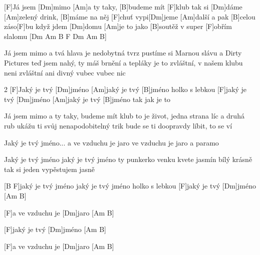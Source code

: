 
[F]Já jsem [Dm]mimo [Am]a ty taky, [B]budeme mít [F]klub
tak si [Dm]dáme [Am]zelený drink, [B]máme na něj [F]chuť
vypi[Dm]jeme [Am]další a pak [B]celou záso[F]bu
když jdem [Dm]domu [Am]je to jako [B]soutěž v super [F]obřím slalomu [Dm Am B F Dm Am B]

Já jsem mimo a tvá hlava je nedobytná tvrz
pustíme si Marnou slávu a Dirty Pictures
teď jsem nahý, ty máš brnění a tepláky
je to zvláštní, v našem klubu neni zvláštní ani divný vubec vubec nic
\begin{multicols}{2}
[F]Jaký je tvý [Dm]jméno
[Am]jaký je tvý [B]jméno
holko s lebkou
[F]jaký je tvý [Dm]jméno
[Am]jaký je tvý [B]jméno
tak jak je to

Já jsem mimo a ty taky, budeme mít klub
to je život, jedna strana líc a druhá rub
ukážu ti svůj nenapodobitelný trik
bude se ti doopravdy líbit, to se ví

Jaký je tvý jméno...
a ve vzduchu je jaro 
ve vzduchu je jaro a paramo

Jaký je tvý jméno
jaký je tvý jméno
ty punkerko
venku kvete jasmín bílý krásně
tak si jeden vypěstujem jasně

[B F]jaký je tvý jméno
jaký je tvý jméno
holko s lebkou
[F]jaký je tvý [Dm]jméno [Am B]

[F]a ve vzduchu je [Dm]jaro [Am B]

[F]jaký je tvý [Dm]jméno [Am B]

[F]a ve vzduchu je [Dm]jaro [Am B]
\end{multicols}